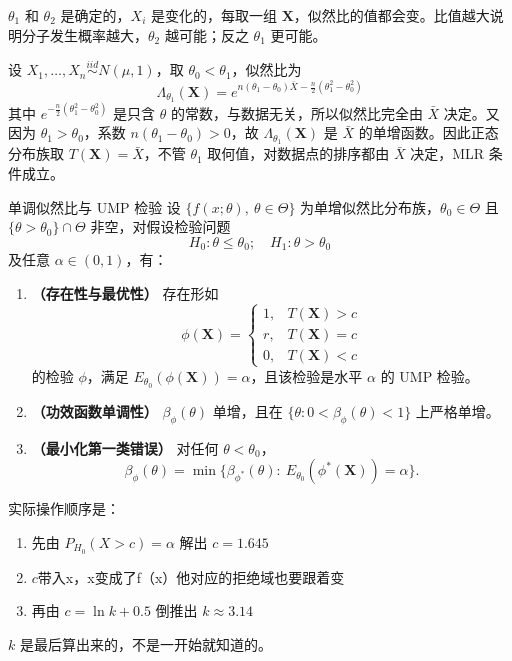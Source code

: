 \begin{dxtips}
  $\theta_1$ 和 $\theta_2$ 是确定的，$X_i$ 是变化的，每取一组 $\boldsymbol{X}$，似然比的值都会变。比值越大说明分子发生概率越大，$\theta_2$ 越可能；反之 $\theta_1$ 更可能。
\end{dxtips}
\begin{example}
设 $X_1, \ldots, X_n \overset{iid}{\sim} N(\mu, 1)$，取 $\theta_0 < \theta_1$，似然比为
$$\Lambda_{\theta_1}(\boldsymbol{X}) = e^{n(\theta_1 - \theta_0)\bar{X} - \frac{n}{2}(\theta_1^2 - \theta_0^2)}$$
其中 $e^{-\frac{n}{2}(\theta_1^2 - \theta_0^2)}$ 是只含 $\theta$ 的常数，与数据无关，所以似然比完全由 $\bar{X}$ 决定。又因为 $\theta_1 > \theta_0$，系数 $n(\theta_1 - \theta_0) > 0$，故 $\Lambda_{\theta_1}(\boldsymbol{X})$ 是 $\bar{X}$ 的单增函数。因此正态分布族取 $T(\boldsymbol{X}) = \bar{X}$，不管 $\theta_1$ 取何值，对数据点的排序都由 $\bar{X}$ 决定，MLR 条件成立。
\end{example}
\begin{theorem}{单调似然比与 UMP 检验}{}
设 $\{f(x;\theta),\ \theta \in \Theta\}$ 为单增似然比分布族，$\theta_0 \in \Theta$ 且 $\{\theta > \theta_0\} \cap \Theta$ 非空，对假设检验问题
$$H_0: \theta \leq \theta_0; \quad H_1: \theta > \theta_0$$
及任意 $\alpha \in (0,1)$，有：
\begin{enumerate}
    \item \textbf{（存在性与最优性）} 存在形如
    $$\phi(\boldsymbol{X}) = \begin{cases} 1, & T(\boldsymbol{X}) > c \\ r, & T(\boldsymbol{X}) = c \\ 0, & T(\boldsymbol{X}) < c \end{cases}$$
    的检验 $\phi$，满足 $E_{\theta_0}(\phi(\boldsymbol{X})) = \alpha$，且该检验是水平 $\alpha$ 的 UMP 检验。

    \item \textbf{（功效函数单调性）} $\beta_\phi(\theta)$ 单增，且在 $\{\theta: 0 < \beta_\phi(\theta) < 1\}$ 上严格单增。

    \item \textbf{（最小化第一类错误）} 对任何 $\theta < \theta_0$，
    $$\beta_\phi(\theta) = \min\{\beta_{\phi^*}(\theta):\ E_{\theta_0}(\phi^*(\boldsymbol{X})) = \alpha\}.$$
\end{enumerate}
\end{theorem}
\begin{note}
实际操作顺序是：
\begin{enumerate}
    \item 先由 $P_{H_0}(X > c) = \alpha$ 解出 $c = 1.645$
    \item $c$带入x，x变成了f（x）他对应的拒绝域也要跟着变
    \item 再由 $c = \ln k + 0.5$ 倒推出 $k \approx 3.14$
\end{enumerate}
$k$ 是最后算出来的，不是一开始就知道的。
\end{note}
